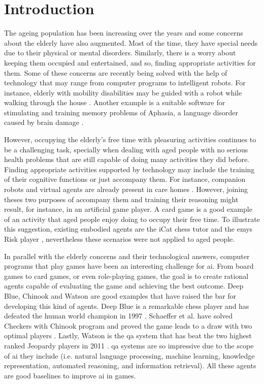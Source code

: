\section{Introduction} \label{introduction}

The ageing population has been increasing over the years and some concerns about the elderly have also augmented.
Most of the time, they have special needs due to their physical or mental disorders.
Similarly, there is a worry about keeping them occupied and entertained, and so, finding appropriate activities for them.
Some of these concerns are recently being solved with the help of technology that may range from computer programs to intelligent robots.
For instance, elderly with mobility disabilities may be guided with a robot while walking through the house \cite{Pollack2002}.
Another example is a suitable software for stimulating and training memory problems of Aphasia, a language disorder caused by brain damage \cite{Pompili2011}.


However, occupying the elderly's free time with pleasuring activities continues to be a challenging task, specially when dealing with aged people with no serious health problems that are still capable of doing many activities they did before.
Finding appropriate activities supported by technology may include the training of their cognitive functions or just accompany them.
For instance, companion robots and virtual agents are already present in care homes \cite{Wada2003,Wada2005,Wada2007,Zancanaro2013}.
However, joining theses two purposes of accompany them and training their reasoning might result, for instance, in an artificial game player.
A card game is a good example of an activity that aged people enjoy doing to occupy their free time.
To illustrate this suggestion, existing embodied agents are the iCat chess tutor \cite{Affective2007} and the \gls{emys} Risk player \cite{Pereira}, nevertheless these scenarios were not applied to aged people.


In parallel with the elderly concerns and their technological answers, computer programs that play games have been an interesting challenge for \gls{ai}.
From board games to card games, or even role-playing games, the goal is to create rational agents capable of evaluating the game and achieving the best outcome.
Deep Blue, Chinook and Watson are good examples that have raised the bar for developing this kind of agents.
Deep Blue is a remarkable chess player and has defeated the human world champion in 1997 \cite{Campbell2002}.
Schaeffer et al. have solved Checkers with Chinook program and proved the game leads to a draw with two optimal players \cite{Schaeffer1996}.
Lastly, Watson is the \gls{qa} system that has beat the two highest ranked Jeopardy players in 2011 \cite{Ferrucci2010}.
\gls{qa} systems are so impressive due to the scope of \gls{ai} they include (i.e. natural language processing, machine learning, knowledge representation, automated reasoning, and information retrieval).
All these agents are good baselines to improve \gls{ai} in games.


